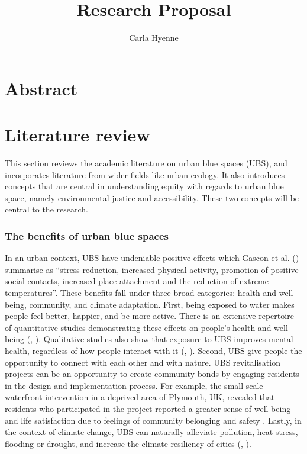 \documentclass{article}
\title{Research Proposal}
\author{Carla Hyenne}
\date{}
\begin{document}
\maketitle

\tableofcontents 


\section{Abstract}



\pagebreak
\section{Literature review}

This section reviews the academic literature on urban blue spaces (UBS), and incorporates literature from wider fields like urban ecology. It also introduces concepts that are central in understanding equity with regards to urban blue space, namely environmental justice and accessibility. These two concepts will be central to the research.

\subsubsection{The benefits of urban blue spaces}

In an urban context, UBS have undeniable positive effects which Gascon et al. (\citeyear{gascon2017outdoor}) summarise as ``stress reduction, increased physical activity, promotion of positive social contacts, increased place attachment and the reduction of extreme temperatures''. These benefits fall under three broad categories: health and well-being, community, and climate adaptation.
First, being exposed to water makes people feel better, happier, and be more active. There is an extensive repertoire of quantitative studies demonstrating these effects on people's health and well-being (\cite{gascon2017outdoor}, \cite{britton2020blue}).
Qualitative studies also show that exposure to UBS improves mental health, regardless of how people interact with it (\cite{garrett2019urban}, \cite{van2021urban}).
Second, UBS give people the opportunity to connect with each other and with nature. UBS revitalisation projects can be an opportunity to create community bonds by engaging residents in the design and implementation process. For example, the small-scale waterfront intervention in a deprived area of Plymouth, UK, revealed that residents who participated in the project reported a greater sense of well-being and life satisfaction due to feelings of community belonging and safety \parencite{van2021urban}.
Lastly, in the context of climate change, UBS can naturally alleviate pollution, heat stress, flooding or drought, and increase the climate resiliency of cities (\cite{lin2020water}, \cite{o2021international}). 
\end{document}
